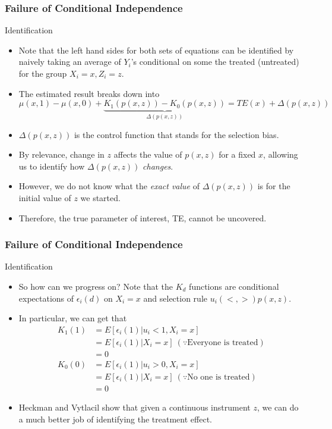 \documentclass{beamer}
\begin{document}
\begin{frame}
\frametitle{Failure of Conditional Independence}
Identification
\begin{itemize}
\item Note that the left hand sides for both sets of equations can be identified by naively taking an average of $Y_i$'s conditional on some the treated (untreated) for the group $X_i=x, Z_i=z$. 
\item The estimated result breaks down into
\[
\mu(x,1)-\mu(x,0)+\underbrace{K_1(p(x,z))-K_0(p(x,z)) }_{\Delta(p(x,z))}= TE(x)+\Delta(p(x,z))
\]
\item $\Delta(p(x,z))$ is the control function that stands for the selection bias.
\item By relevance, change in $z$ affects the value of $p(x,z)$ for a fixed $x$, allowing us to identify how $\Delta(p(x,z))$ \textit{changes}.
\item However, we do not know what the \textit{exact value} of $\Delta(p(x,z))$ is for the initial value of $z$ we started. 
\item Therefore, the true parameter of interest, TE, cannot be uncovered.
\end{itemize}
\end{frame}

\begin{frame}
\frametitle{Failure of Conditional Independence}
Identification
\begin{itemize}
\item So how can we progress on? Note that the $K_d$ functions are conditional expectations of $\epsilon_i(d)$ on $X_i=x$ and selection rule $u_i (<,>) p(x,z)$. 
\item In particular, we can get that
\begin{align*}
K_1(1) &=E[\epsilon_i(1)|u_i<1,X_i=x] \\
&=E[\epsilon_i(1)|X_i=x] \ (\because\text{Everyone is treated})\\
&=0\\
K_0(0) &=E[\epsilon_i(1)|u_i>0,X_i=x] \\
&=E[\epsilon_i(1)|X_i=x] \ (\because\text{No one is treated})\\
&=0
\end{align*}
\item Heckman and Vytlacil show that given a continuous instrument $z$, we can do a much better job of identifying the treatment effect. 
\end{itemize}
\end{frame}
\end{document}
